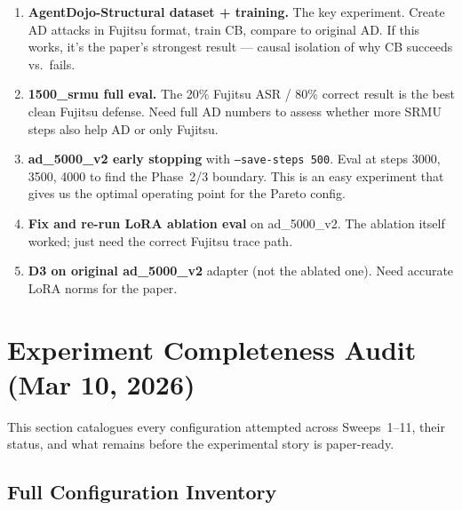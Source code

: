 \documentclass[11pt]{article}
\begin{document}
\begin{enumerate}
  \item \textbf{AgentDojo-Structural dataset + training.}  The key experiment.
        Create AD attacks in Fujitsu format, train CB, compare to original AD.
        If this works, it's the paper's strongest result --- causal isolation
        of why CB succeeds vs.\ fails.

  \item \textbf{1500\_srmu full eval.}  The 20\% Fujitsu ASR / 80\% correct
        result is the best clean Fujitsu defense.  Need full AD numbers to
        assess whether more SRMU steps also help AD or only Fujitsu.

  \item \textbf{ad\_5000\_v2 early stopping} with \texttt{--save-steps 500}.
        Eval at steps 3000, 3500, 4000 to find the Phase~2/3 boundary.
        This is an easy experiment that gives us the optimal operating point
        for the Pareto config.

  \item \textbf{Fix and re-run LoRA ablation eval} on ad\_5000\_v2.
        The ablation itself worked; just need the correct Fujitsu trace path.

  \item \textbf{D3 on original ad\_5000\_v2} adapter (not the ablated one).
        Need accurate LoRA norms for the paper.
\end{enumerate}

\section{Experiment Completeness Audit (Mar 10, 2026)}
\label{sec:completeness}

This section catalogues every configuration attempted across Sweeps~1--11,
their status, and what remains before the experimental story is paper-ready.

\subsection{Full Configuration Inventory}
\end{document}

